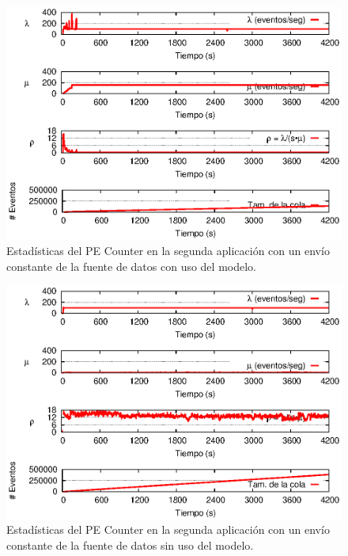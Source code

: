 \clearpage

\begin{figure}[!ht]
\centering
    \includegraphics[scale=1]{images/exp/app2/uniform/cm/statusCounterPE.eps}
    \caption{Estad\'isticas del PE Counter en la segunda aplicaci\'on con un env\'io constante de la fuente de datos con uso del modelo.}
    \label{fig:app2-uniform-statusCounterPE-cm}
\end{figure}

\begin{figure}[!ht]
\centering
    \includegraphics[scale=1]{images/exp/app2/uniform/sm/statusCounterPE.eps}
    \caption{Estad\'isticas del PE Counter en la segunda aplicaci\'on con un env\'io constante de la fuente de datos sin uso del modelo.}
    \label{fig:app2-uniform-statusCounterPE-sm}
\end{figure}

